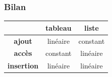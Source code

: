 \documentclass[svgnames,11pt]{beamer}
\begin{document}
\begin{frame}
    \frametitle{Bilan}

    \begin{center}

        \renewcommand{\arraystretch}{2}

        \begin{tabular}{|*{3}{c|}}
            \hline
                               & \textbf{tableau} & \textbf{liste} \\
            \hline
            \textbf{ajout}     & linéaire         & constant       \\
            \hline
            \textbf{accès}     & constant         & linéaire       \\
            \hline
            \textbf{insertion} & linéaire         & linéaire       \\
            \hline
        \end{tabular}
        \renewcommand{\arraystretch}{1}

    \end{center}

\end{frame}
\end{document}
